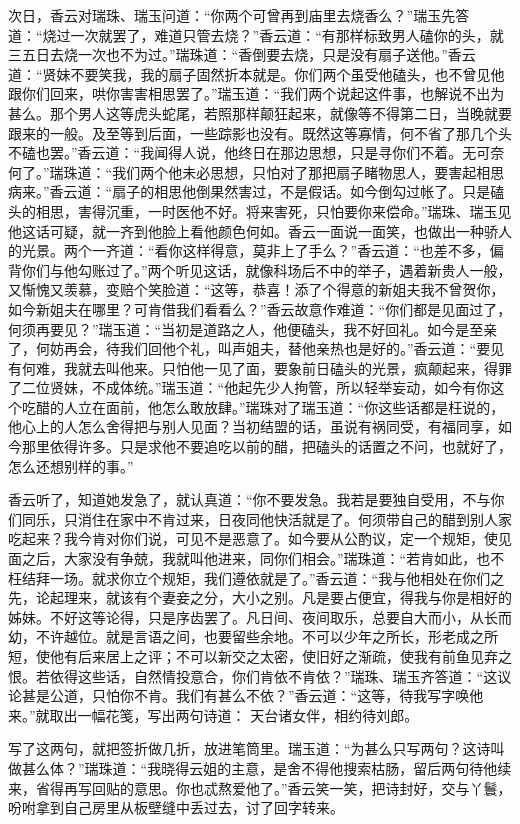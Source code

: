 \documentclass[a4paper,12pt,UTF8,twoside]{ctexbook}
\begin{document}
次日，香云对瑞珠、瑞玉问道：“你两个可曾再到庙里去烧香么？”瑞玉先答道：“烧过一次就罢了，难道只管去烧？”香云道：“有那样标致男人磕你的头，就三五日去烧一次也不为过。”瑞珠道：“香倒要去烧，只是没有扇子送他。”香云道：“贤妹不要笑我，我的扇子固然折本就是。你们两个虽受他磕头，也不曾见他跟你们回来，哄你害害相思罢了。”瑞玉道：“我们两个说起这件事，也解说不出为甚么。那个男人这等虎头蛇尾，若照那样颠狂起来，就像等不得第二日，当晚就要跟来的一般。及至等到后面，一些踪影也没有。既然这等寡情，何不省了那几个头不磕也罢。”香云道：“我闻得人说，他终日在那边思想，只是寻你们不着。无可奈何了。”瑞珠道：“我们两个他未必思想，只怕对了那把扇子睹物思人，要害起相思病来。”香云道：“扇子的相思他倒果然害过，不是假话。如今倒勾过帐了。只是磕头的相思，害得沉重，一时医他不好。将来害死，只怕要你来偿命。”瑞珠、瑞玉见他这话可疑，就一齐到他脸上看他颜色何如。香云一面说一面笑，也做出一种骄人的光景。两个一齐道：“看你这样得意，莫非上了手么？”香云道：“也差不多，偏背你们与他勾账过了。”两个听见这话，就像科场后不中的举子，遇着新贵人一般，又惭愧又羡慕，变赔个笑脸道：“这等，恭喜！添了个得意的新姐夫我不曾贺你，如今新姐夫在哪里？可肯借我们看看么？”香云故意作难道：“你们都是见面过了，何须再要见？”瑞玉道：“当初是道路之人，他便磕头，我不好回礼。如今是至亲了，何妨再会，待我们回他个礼，叫声姐夫，替他亲热也是好的。”香云道：“要见有何难，我就去叫他来。只怕他一见了面，要象前日磕头的光景，疯颠起来，得罪了二位贤妹，不成体统。”瑞玉道：“他起先少人拘管，所以轻举妄动，如今有你这个吃醋的人立在面前，他怎么敢放肆。”瑞珠对了瑞玉道：“你这些话都是枉说的，他心上的人怎么舍得把与别人见面？当初结盟的话，虽说有祸同受，有福同享，如今那里依得许多。只是求他不要追吃以前的醋，把磕头的话置之不问，也就好了，怎么还想别样的事。”

香云听了，知道她发急了，就认真道：“你不要发急。我若是要独自受用，不与你们同乐，只消住在家中不肯过来，日夜同他快活就是了。何须带自己的醋到别人家吃起来？我今肯对你们说，可见不是恶意了。如今要从公酌议，定一个规矩，使见面之后，大家没有争兢，我就叫他进来，同你们相会。”瑞珠道：“若肯如此，也不枉结拜一场。就求你立个规矩，我们遵依就是了。”香云道：“我与他相处在你们之先，论起理来，就该有个妻妾之分，大小之别。凡是要占便宜，得我与你是相好的姊妹。不好这等论得，只是序齿罢了。凡日间、夜间取乐，总要自大而小，从长而幼，不许越位。就是言语之间，也要留些余地。不可以少年之所长，形老成之所短，使他有后来居上之评；不可以新交之太密，使旧好之渐疏，使我有前鱼见弃之恨。若依得这些话，自然情投意合，你们肯依不肯依？”瑞珠、瑞玉齐答道：“这议论甚是公道，只怕你不肯。我们有甚么不依？”香云道：“这等，待我写字唤他来。”就取出一幅花笺，写出两句诗道：
天台诸女伴，相约待刘郎。

写了这两句，就把签折做几折，放进笔筒里。瑞玉道：“为甚么只写两句？这诗叫做甚么体？”瑞珠道：“我晓得云姐的主意，是舍不得他搜索枯肠，留后两句待他续来，省得再写回贴的意思。你也忒熬爱他了。”香云笑一笑，把诗封好，交与丫鬟，吩咐拿到自己房里从板壁缝中丢过去，讨了回字转来。
\end{document}
